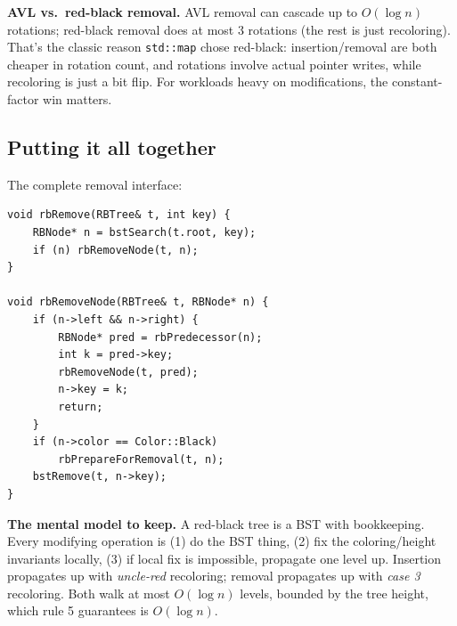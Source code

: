 \documentclass[11pt]{article}
\begin{document}
\begin{notebox}
\textbf{AVL vs.\ red-black removal.} AVL removal can cascade up to $O(\log n)$ rotations; red-black removal does at most 3 rotations (the rest is just recoloring). That's the classic reason \texttt{std::map} chose red-black: insertion/removal are both cheaper in rotation count, and rotations involve actual pointer writes, while recoloring is just a bit flip. For workloads heavy on modifications, the constant-factor win matters.
\end{notebox}

\subsection*{Putting it all together}

The complete removal interface:

\begin{lstlisting}[basicstyle=\ttfamily\small,frame=single]
void rbRemove(RBTree& t, int key) {
    RBNode* n = bstSearch(t.root, key);
    if (n) rbRemoveNode(t, n);
}

void rbRemoveNode(RBTree& t, RBNode* n) {
    if (n->left && n->right) {
        RBNode* pred = rbPredecessor(n);
        int k = pred->key;
        rbRemoveNode(t, pred);
        n->key = k;
        return;
    }
    if (n->color == Color::Black)
        rbPrepareForRemoval(t, n);
    bstRemove(t, n->key);
}
\end{lstlisting}

\begin{ideabox}
\textbf{The mental model to keep.} A red-black tree is a BST with bookkeeping. Every modifying operation is (1) do the BST thing, (2) fix the coloring/height invariants locally, (3) if local fix is impossible, propagate one level up. Insertion propagates up with \emph{uncle-red} recoloring; removal propagates up with \emph{case 3} recoloring. Both walk at most $O(\log n)$ levels, bounded by the tree height, which rule 5 guarantees is $O(\log n)$.
\end{ideabox}
\end{document}

